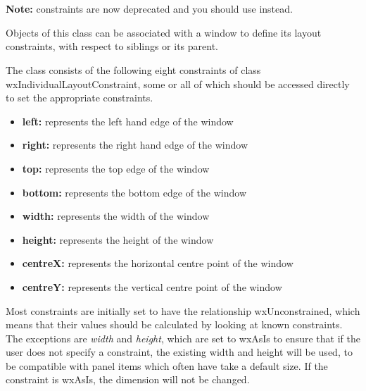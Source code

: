 \section{}\label{wxlayoutconstraints}

{\bf Note:} constraints are now deprecated and you should use  instead.

Objects of this class can be associated with a window to define its
layout constraints, with respect to siblings or its parent.

The class consists of the following eight constraints of class wxIndividualLayoutConstraint,
some or all of which should be accessed directly to set the appropriate
constraints.

\begin{itemize}\itemsep=0pt
\item {\bf left:} represents the left hand edge of the window
\item {\bf right:} represents the right hand edge of the window
\item {\bf top:} represents the top edge of the window
\item {\bf bottom:} represents the bottom edge of the window
\item {\bf width:} represents the width of the window
\item {\bf height:} represents the height of the window
\item {\bf centreX:} represents the horizontal centre point of the window
\item {\bf centreY:} represents the vertical centre point of the window
\end{itemize}

Most constraints are initially set to have the relationship wxUnconstrained,
which means that their values should be calculated by looking at known constraints.
The exceptions are {\it width} and {\it height}, which are set to wxAsIs to
ensure that if the user does not specify a constraint, the existing
width and height will be used, to be compatible with panel items which often
have take a default size. If the constraint is wxAsIs, the dimension will
not be changed.


